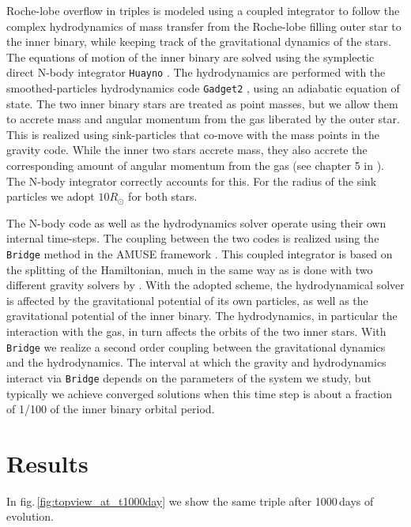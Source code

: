 \documentclass{aastex62}
\begin{document}
Roche-lobe overflow in triples is modeled using a coupled integrator
to follow the complex hydrodynamics of mass transfer from the
Roche-lobe filling outer star to the inner binary, while keeping track
of the gravitational dynamics of the stars.  The equations of motion
of the inner binary are solved using the symplectic direct N-body
integrator \texttt{Huayno} \citep{2012NewA...17..711P}. The
hydrodynamics are performed with the smoothed-particles hydrodynamics
code \texttt{Gadget2} \citep{2000ascl.soft03001S}, using an adiabatic
equation of state.  The two inner binary stars are treated as point
masses, but we allow them to accrete mass and angular momentum from
the gas liberated by the outer star.  This is realized using
sink-particles that co-move with the mass points in the gravity
code. While the inner two stars accrete mass, they also accrete the
corresponding amount of angular momentum from the gas (see chapter 5
in \cite{AMUSE}).  The N-body integrator correctly accounts for this.  For the radius of the sink particles we adopt $10
R_\odot$ for both stars.

The N-body code as well as the hydrodynamics solver operate using
their own internal time-steps. The coupling between the two codes is
realized using the \texttt{Bridge} method in the AMUSE framework
\citep[see Sect.\.4.3.1 in][]{2013CoPhC.183..456P}.  This coupled
integrator is based on the splitting of the Hamiltonian, much in the
same way as is done with two different gravity solvers by
\cite{2007PASJ...59.1095F}. With the adopted scheme, the
hydrodynamical solver is affected by the gravitational potential of
its own particles, as well as the gravitational potential of the inner
binary. The hydrodynamics, in particular the interaction with the gas,
in turn affects the orbits of the two inner stars. With
\texttt{Bridge} we realize a second order coupling between the
gravitational dynamics and the hydrodynamics.  The interval at which
the gravity and hydrodynamics interact via \texttt{Bridge} depends on
the parameters of the system we study, but typically we achieve
converged solutions when this time step is about a fraction of 1/100
of the inner binary orbital period.

\section{Results} \label{results}

In fig.\,\ref{fig:topview_at_t1000day} we show the same triple after
1000\,days of evolution.
\end{document}
